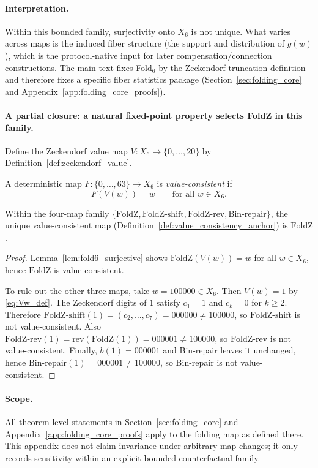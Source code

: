 \paragraph{Interpretation.}
Within this bounded family, surjectivity onto $X_6$ is not unique.
What varies across maps is the induced fiber structure (the support and distribution of $g(w)$), which is the protocol-native input for later compensation/connection constructions.
The main text fixes Fold$_6$ by the Zeckendorf-truncation definition and therefore fixes a specific fiber statistics package (Section~\ref{sec:folding_core} and Appendix~\ref{app:folding_core_proofs}).

\paragraph{A partial closure: a natural fixed-point property selects FoldZ in this family.}
Define the Zeckendorf value map $V:X_6\to\{0,\ldots,20\}$ by
Definition~\ref{def:zeckendorf_value}.
\begin{definition}
\label{def:value_consistency_anchor}
A deterministic map $F:\{0,\ldots,63\}\to X_6$ is \emph{value-consistent} if
\[
F(V(w))=w\qquad\text{for all }w\in X_6.
\]
\end{definition}
\begin{proposition}
\label{prop:value_consistency_selects_foldz}
Within the four-map family $\{\mathrm{FoldZ},\mathrm{FoldZ\mbox{-}shift},\mathrm{FoldZ\mbox{-}rev},\mathrm{Bin\mbox{-}repair}\}$,
the unique value-consistent map (Definition~\ref{def:value_consistency_anchor}) is $\mathrm{FoldZ}$.
\end{proposition}
\begin{proof}
Lemma~\ref{lem:fold6_surjective} shows $\mathrm{FoldZ}(V(w))=w$ for all $w\in X_6$, hence $\mathrm{FoldZ}$ is value-consistent.

To rule out the other three maps, take $w=100000\in X_6$.
Then $V(w)=1$ by \eqref{eq:Vw_def}.
The Zeckendorf digits of $1$ satisfy $c_1=1$ and $c_k=0$ for $k\ge 2$.
Therefore $\mathrm{FoldZ\mbox{-}shift}(1)=(c_2,\ldots,c_7)=000000\neq 100000$, so $\mathrm{FoldZ\mbox{-}shift}$ is not value-consistent.
Also $\mathrm{FoldZ\mbox{-}rev}(1)=\mathrm{rev}(\mathrm{FoldZ}(1))=000001\neq 100000$, so $\mathrm{FoldZ\mbox{-}rev}$ is not value-consistent.
Finally, $b(1)=000001$ and Bin-repair leaves it unchanged, hence $\mathrm{Bin\mbox{-}repair}(1)=000001\neq 100000$, so Bin-repair is not value-consistent.
\end{proof}

\paragraph{Scope.}
All theorem-level statements in Section~\ref{sec:folding_core} and Appendix~\ref{app:folding_core_proofs} apply to the folding map as defined there.
This appendix does not claim invariance under arbitrary map changes; it only records sensitivity within an explicit bounded counterfactual family.


